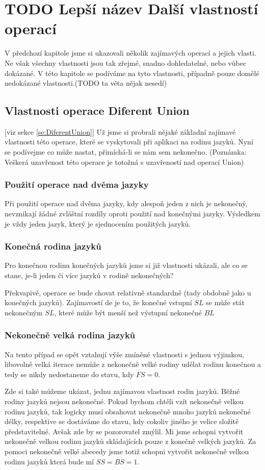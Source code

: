 \chapter{TODO Lepší název Další vlastností operací}
V předchozí kapitole jsme si ukazovali několik zajímavých operací a jejich vlasti. Ne však všechny vlastnosti jsou tak zřejmé, snadno dohledatelné, nebo vůbec dokázané. V této kapitole se podíváme na tyto vlastnosti, případně pouze domělé nedokázané vlastnosti.(TODO ta věta nějak nesedí)

\section{Vlastnosti operace Diferent Union}
[viz sekce \ref{se:DiferentUnion}]
Už jsme si probrali nějaké základní zajímavé vlastnosti této operace, které se vyskytovali při aplikaci na rodinu jazyků. Nyní se podívejme co může nastat, přimíchá-li se nám sem nekonečno. (Poznámka: Veškerá uzavřenost této operace je totožná s uzavřeností nad operací Union)

\subsection{Použití operace nad dvěma jazyky}
Při použití operace nad dvěma jazyky, kdy alespoň jeden z nich je nekonečný, nevznikají žádné zvláštní rozdíly oproti použití nad konečnými jazyky. Výsledkem je vždy jeden jazyk, který je sjednocením použitých jazyků.

\subsection{Konečná rodina jazyků}
Pro konečnou rodinu konečných jazyků jsme si již vlastnosti ukázali, ale co se stane, je-li jeden či více jazyků v rodině nekonečných?

Překvapivě, operace se bude chovat relativně standardně (tady obdobně jako u konečných jazyků). Zajímavostí de je to, že konečné vstupní $SL$ se může stát nekonečným $SL$, které může být menší než výstupní nekonečné $BL$

\subsection{Nekonečně velká rodina jazyků}
Na tento případ se opět vztahují výše zmíněné vlastnosti s jednou výjimkou, libovolně velká iterace nemůže z nekonečně velké rodiny udělat rodinu konečnou a tedy se nikdy nedostaneme do stavu, kdy $FS = 0$.

Zde si také můžeme ukázat, jednu zajímavou vlastnost rodin jazyků. Běžné rodiny jazyků nejsou nekonečné. Pokud bychom chtěli vzít nekonečně velkou rodinu jazyků, tak logicky musí obsahovat nekonečně mnoho jazyků nekonečné délky, respektive se dostáváme do stavu, kdy cokoliv jiného je velice složitě představitelné. Avšak zde by se pozorovatel zmýlil. Mi jsme schopni vytvořit nekonečně velkou rodinu jazyků skládajících pouze z konečně velkých jazyků. Za pomoci nekonečně velké abecedy jsme totiž schopni vytvořit nekonečně velkou rodinu jazyků která bude mí $SS = BS = 1$.

